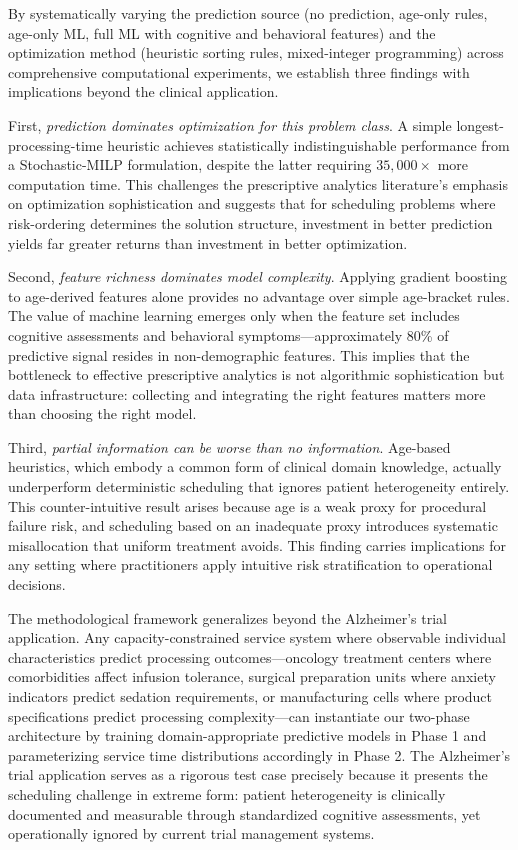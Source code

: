 \documentclass[11pt,a4paper]{article}
\begin{document}
By systematically varying the prediction source (no prediction, age-only rules, age-only ML, full ML with cognitive and behavioral features) and the optimization method (heuristic sorting rules, mixed-integer programming) across comprehensive computational experiments, we establish three findings with implications beyond the clinical application.

First, \textit{prediction dominates optimization for this problem class}. A simple longest-processing-time heuristic achieves statistically indistinguishable performance from a Stochastic-MILP formulation, despite the latter requiring $35{,}000\times$ more computation time. This challenges the prescriptive analytics literature's emphasis on optimization sophistication and suggests that for scheduling problems where risk-ordering determines the solution structure, investment in better prediction yields far greater returns than investment in better optimization.

Second, \textit{feature richness dominates model complexity}. Applying gradient boosting to age-derived features alone provides no advantage over simple age-bracket rules. The value of machine learning emerges only when the feature set includes cognitive assessments and behavioral symptoms---approximately 80\% of predictive signal resides in non-demographic features. This implies that the bottleneck to effective prescriptive analytics is not algorithmic sophistication but data infrastructure: collecting and integrating the right features matters more than choosing the right model.

Third, \textit{partial information can be worse than no information}. Age-based heuristics, which embody a common form of clinical domain knowledge, actually underperform deterministic scheduling that ignores patient heterogeneity entirely. This counter-intuitive result arises because age is a weak proxy for procedural failure risk, and scheduling based on an inadequate proxy introduces systematic misallocation that uniform treatment avoids. This finding carries implications for any setting where practitioners apply intuitive risk stratification to operational decisions.

The methodological framework generalizes beyond the Alzheimer's trial application. Any capacity-constrained service system where observable individual characteristics predict processing outcomes---oncology treatment centers where comorbidities affect infusion tolerance, surgical preparation units where anxiety indicators predict sedation requirements, or manufacturing cells where product specifications predict processing complexity---can instantiate our two-phase architecture by training domain-appropriate predictive models in Phase 1 and parameterizing service time distributions accordingly in Phase 2. The Alzheimer's trial application serves as a rigorous test case precisely because it presents the scheduling challenge in extreme form: patient heterogeneity is clinically documented and measurable through standardized cognitive assessments, yet operationally ignored by current trial management systems.
\end{document}
